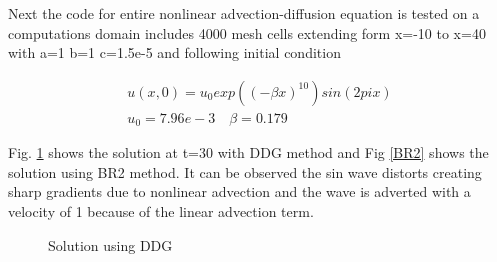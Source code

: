 \documentclass[12pt]{elsarticle}
\begin{document}
\clearpage

Next the code for entire nonlinear advection-diffusion equation is tested on a computations domain includes 4000 mesh cells extending form x=-10 to x=40 with a=1 b=1 c=1.5e-5 and following initial condition

\begin{equation}
\begin{gathered}
u(x,0)=u_0 exp((-\beta x)^10)sin(2pix)\\
u_0=7.96e-3 \quad \beta=0.179
\end{gathered}
\end{equation}

Fig. \ref{DDGsel} shows the solution at t=30 with DDG method and Fig \ref{BR2} shows the solution using BR2 method. It can be observed the sin wave distorts creating sharp gradients due to nonlinear advection and the wave is adverted with a velocity of 1 because of the linear advection term.

\begin{figure}[ht]
\centering
{}
%
%
\caption{Solution using DDG }
\label{DDGsel}
\end{figure}
\end{document}
